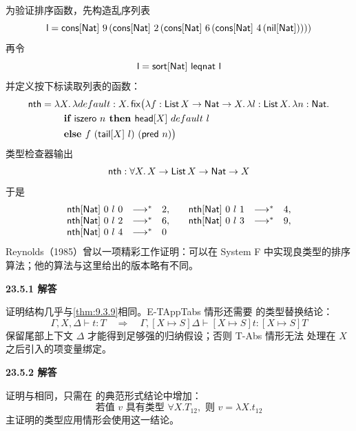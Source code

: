 \begin{taplauthorsolutionentrybox}
为验证排序函数，先构造乱序列表
\[
\mathsf{l}=\mathsf{cons}[\mathsf{Nat}]\ 9\,
 (\mathsf{cons}[\mathsf{Nat}]\ 2\,
  (\mathsf{cons}[\mathsf{Nat}]\ 6\,
   (\mathsf{cons}[\mathsf{Nat}]\ 4\,
    (\mathsf{nil}[\mathsf{Nat}]))))
\]
再令
\[
\taplterm{l}=\taplterm{sort}[\tapltype{Nat}]\ \taplterm{leqnat}\ \taplterm{l}
\]
并定义按下标读取列表的函数：
\[
\begin{aligned}
\taplterm{nth}={}&\lambda X.\,\lambda default:X.\,
\taplterm{fix}\bigl(\lambda f:\tapltype{List}\,X\to\tapltype{Nat}\to X.\,
\lambda l:\tapltype{List}\,X.\,\lambda n:\tapltype{Nat}.\\
&\quad\textbf{if }\taplterm{iszero}\ n
 \textbf{ then }\taplterm{head}[X]\ default\ l\\
&\quad\textbf{else }f\ (\taplterm{tail}[X]\ l)\ (\taplterm{pred}\ n)\bigr)
\end{aligned}
\]
类型检查器输出
\[
\mathsf{nth}:\forall X.\,X\to\mathsf{List}\,X\to\mathsf{Nat}\to X
\]
于是
\[
\begin{array}{rcl@{\qquad}rcl}
\taplterm{nth}[\tapltype{Nat}]\ 0\ l\ 0&\longrightarrow^*&2,&
\taplterm{nth}[\tapltype{Nat}]\ 0\ l\ 1&\longrightarrow^*&4,\\
\taplterm{nth}[\tapltype{Nat}]\ 0\ l\ 2&\longrightarrow^*&6,&
\taplterm{nth}[\tapltype{Nat}]\ 0\ l\ 3&\longrightarrow^*&9,\\
\taplterm{nth}[\tapltype{Nat}]\ 0\ l\ 4&\longrightarrow^*&0
\end{array}
\]
Reynolds（1985）曾以一项精彩工作证明：可以在 System F 中实现良类型的排序
算法；他的算法与这里给出的版本略有不同。
\end{taplauthorsolutionentrybox}

\begin{taplauthorsolutionentrybox}
\label{sol:author:23.5.1}
\textbf{23.5.1 解答}

证明结构几乎与\cref{thm:9.3.9}相同。E-TAppTabs 情形还需要
的类型替换结论：
\[
\Gamma,X,\Delta\vdash t:T
\quad\Longrightarrow\quad
\Gamma,[X\mapsto S]\Delta\vdash[X\mapsto S]t:[X\mapsto S]T
\]
保留尾部上下文 \(\Delta\) 才能得到足够强的归纳假设；否则 T-Abs 情形无法
处理在 \(X\) 之后引入的项变量绑定。
\end{taplauthorsolutionentrybox}

\begin{taplauthorsolutionentrybox}
\label{sol:author:23.5.2}
\textbf{23.5.2 解答}

证明与相同，只需在
的典范形式结论中增加：
\[
\text{若值 }v\text{ 具有类型 }\forall X.T_{12},
\text{ 则 }v=\lambda X.t_{12}
\]
主证明的类型应用情形会使用这一结论。
\end{taplauthorsolutionentrybox}

